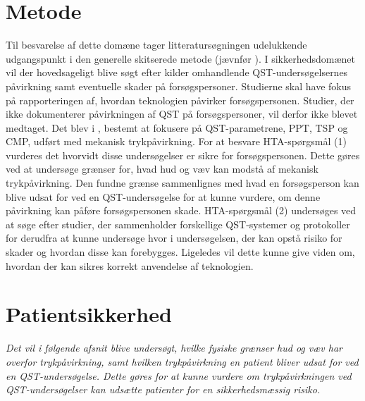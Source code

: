 \section{Metode}
Til besvarelse af dette domæne tager litteratursøgningen udelukkende udgangspunkt i den generelle skitserede metode (jævnfør ). I sikkerhedsdomænet vil der hovedsageligt blive søgt efter kilder omhandlende QST-undersøgelsernes påvirkning samt eventuelle skader på forsøgspersoner. Studierne skal have fokus på rapporteringen af, hvordan teknologien påvirker forsøgspersonen. Studier, der ikke dokumenterer påvirkningen af QST på forsøgspersoner, vil derfor ikke blevet medtaget. Det blev i , bestemt at fokusere på QST-parametrene, PPT, TSP og CMP, udført med mekanisk trykpåvirkning. For at besvare HTA-spørgsmål (1) vurderes det hvorvidt disse undersøgelser er sikre for forsøgspersonen. Dette gøres ved at undersøge grænser for, hvad hud og væv kan modstå af mekanisk trykpåvirkning. Den fundne grænse sammenlignes med hvad en forsøgsperson kan blive udsat for ved en QST-undersøgelse for at kunne vurdere, om denne påvirkning kan påføre forsøgspersonen skade.  HTA-spørgsmål (2) undersøges ved at søge efter studier, der sammenholder forskellige QST-systemer og protokoller for derudfra at kunne undersøge hvor i undersøgelsen, der kan opstå risiko for skader og hvordan disse kan forebygges. Ligeledes vil dette kunne give viden om, hvordan der kan sikres korrekt anvendelse af teknologien.

\section{Patientsikkerhed}
\textit{Det vil i følgende afsnit blive undersøgt, hvilke fysiske grænser hud og væv har overfor trykpåvirkning, samt hvilken trykpåvirkning en patient bliver udsat for ved en QST-undersøgelse. Dette gøres for at kunne vurdere om trykpåvirkningen ved QST-undersøgelser kan udsætte patienter for en sikkerhedsmæssig risiko.}

